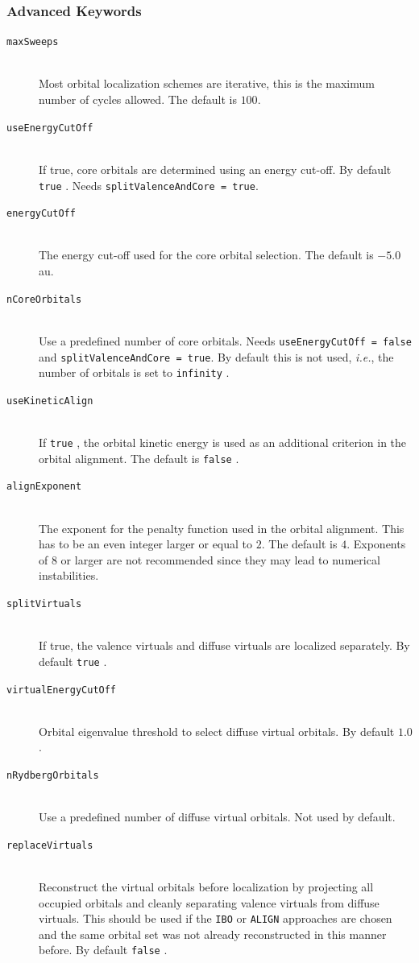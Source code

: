 \documentclass[bibliography=totocnumbered,a4paper,10pt,oneside]{scrbook}
\newcommand{\ttt}[1]{%
  \begingroup\setlength{\fboxsep}{1pt}%
  \colorbox{serenity-green!30}{\texttt{\hspace*{2pt}\vphantom{(g}#1\hspace*{2pt}}}%
  \endgroup
}
\begin{document}
\subsubsection{Advanced Keywords}
\begin{description}
 \item [\texttt{maxSweeps}]\hfill \\
   Most orbital localization schemes are iterative, this is the maximum number of cycles allowed.
   The default is $100$.
 \item [\texttt{useEnergyCutOff}]\hfill \\
   If true, core orbitals are determined using an energy cut-off. By default \ttt{true}.
   Needs \texttt{splitValenceAndCore = true}.
 \item [\texttt{energyCutOff}]\hfill \\
    The energy cut-off used for the core orbital selection. The default is $-5.0$ au.
 \item [\texttt{nCoreOrbitals}]\hfill \\
    Use a predefined number of core orbitals. Needs \texttt{useEnergyCutOff = false} and \texttt{splitValenceAndCore = true}.
    By default this is not used, \emph{i.e.}, the number of orbitals is set to \ttt{infinity}.
 \item [\texttt{useKineticAlign}]\hfill \\
   If \ttt{true}, the orbital kinetic energy is used as an additional criterion in the orbital alignment.
   The default is \ttt{false}.
 \item [\texttt{alignExponent}]\hfill \\
   The exponent for the penalty function used in the orbital alignment. This has to be an even integer
   larger or equal to $2$. The default is $4$. Exponents of $8$ or larger are not recommended since they
   may lead to numerical instabilities.
 \item [\texttt{splitVirtuals}]\hfill \\
   If true, the valence virtuals and diffuse virtuals are localized separately. By default \ttt{true}.
 \item [\texttt{virtualEnergyCutOff}]\hfill \\
   Orbital eigenvalue threshold to select diffuse virtual orbitals. By default $1.0$.
 \item [\texttt{nRydbergOrbitals}]\hfill \\
   Use a predefined number of diffuse virtual orbitals. Not used by default.
 \item [\texttt{replaceVirtuals}]\hfill \\
   Reconstruct the virtual orbitals before localization by projecting all occupied orbitals
   and cleanly separating valence virtuals from diffuse virtuals. This should be used if the
   \ttt{IBO} or \ttt{ALIGN} approaches are chosen and the same orbital set was not already reconstructed
   in this manner before. By default \ttt{false}.
\end{description}
\end{document}

